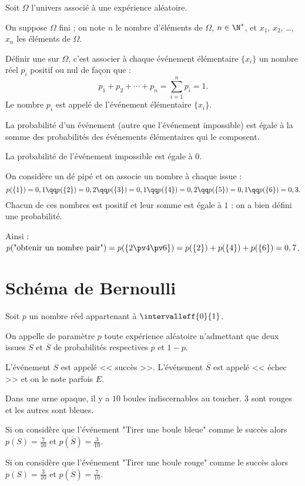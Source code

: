 \documentclass[10pt,openright,twoside,french]{book}
\begin{document}
\begin{Defi}
Soit $\Omega$ l'univers associé à une expérience aléatoire.\par
On suppose $\Omega$ fini ; on note $n$ le nombre d'éléments de $\Omega$, $n \in \N^*$, et $x_1$, $x_2$, \ldots , $x_n$ les éléments de $\Omega$.\par
Définir une  sur $\Omega$, c'est associer à chaque événement élémentaire $\{x_i\}$ un nombre réel $p_i$ positif ou nul de façon que :
\[p_1 + p_2 + \cdots + p_n = \sum_{i=1}^n p_i = 1.\]
Le nombre $p_i$ est appelé  de l'événement élémentaire $\{x_i\}$.\par
La probabilité d'un événement (autre que l'événement impossible) est égale à la somme des probabilités des événements élémentaires qui le composent.\par
La probabilité de l'événement impossible est égale à $0$.
\end{Defi}

\begin{Exemple}
    On considère un dé pipé et on associe un nombre à chaque issue :
    \[p(\{1\}) = 0,1 \qq p(\{2\}) = 0,2 \qq p(\{3\}) = 0,1 \qq p(\{4\}) = 0,2 \qq p(\{5\}) = 0,1 \qq p(\{6\}) = 0,3.\]
    Chacun de ces nombres est positif et leur somme est égale à $1$ : on a bien défini une probabilité.\par
    Ainsi : $p(\text{"obtenir un nombre pair"}) = p(\{2\pv4\pv6\}) =  p(\{2\}) + p(\{4\}) + p(\{6\}) = 0,7$.
\end{Exemple}

\section{Schéma de Bernoulli}

\begin{Defi}
    Soit $p$ un nombre réel appartenant à $\intervalleff{0}{1}$.\par
    On appelle  de paramètre $p$ toute expérience aléatoire n'admettant que deux issues $S$ et $\overline S$ de probabilités respectives $p$ et $1-p$.\par
    L'événement $S$ est appelé << succès >>. L'événement $\overline S$ est appelé << échec >> et on le note parfois $E$.
\end{Defi}

\begin{Exemple}
    Dans une urne opaque, il y a $10$ boules indiscernables au toucher. $3$ sont rouges et les autres sont bleues.\par
    Si on considère que l'événement "Tirer une boule bleue" comme le succès alors $p(S) = \frac{7}{10}$ et $p(\overline S) = \frac{3}{10}$.\par
    Si on considère que l'événement "Tirer une boule rouge" comme le succès alors $p(S) = \frac{3}{10}$ et $p(\overline S) = \frac{7}{10}$.
\end{Exemple}
\end{document}
